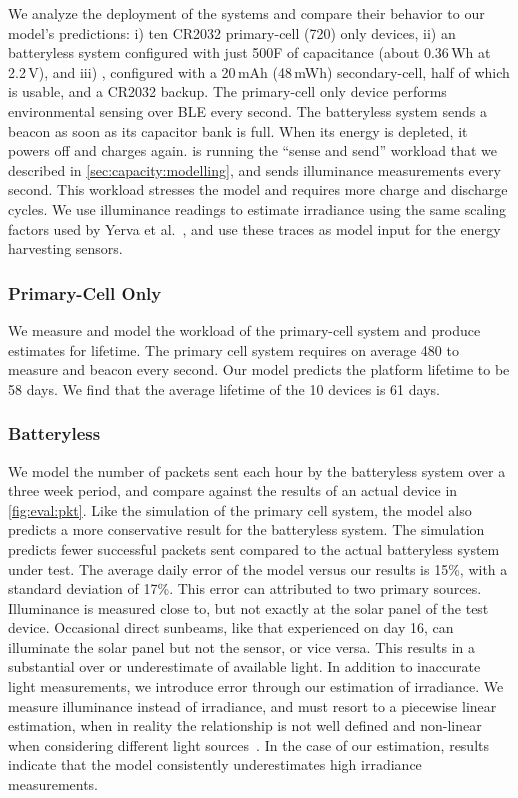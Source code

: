 We analyze the deployment of the systems 
and compare their behavior to our
model's predictions: i) ten CR2032 primary-cell (720\ssi{\milli\Wh}) only devices, ii) an
batteryless system configured with just 500\textmu F of capacitance (about
0.36\,\textmu Wh at 2.2\,V), and iii) \name, configured with a 20\,mAh
(48\,mWh) secondary-cell, half of which is usable, and a CR2032 backup.  The
primary-cell only device performs environmental sensing over BLE every second.
The batteryless system  sends a beacon as soon as its capacitor bank is full.
When its energy is depleted, it powers off and charges
again. \name is running the ``sense and send'' workload that we described in
\cref{sec:capacity:modelling}, and sends illuminance measurements every second. This
workload stresses the model and requires more charge and discharge cycles.  We
use \name illuminance readings to estimate irradiance using the same scaling factors used by
Yerva et al.~\cite{yervaGrafting12}, and use these traces as
model input for the energy harvesting sensors.

\subsubsection{Primary-Cell Only}
We measure and model the workload of the primary-cell system and produce estimates for
lifetime. The primary cell system requires on average 480\ssi{\micro\watt} to measure and beacon every second. Our model predicts the platform lifetime
to be 58 days.  We find that the average lifetime of the 10 devices is 61 days.

\subsubsection{Batteryless}
We model the number of packets sent each hour by the
batteryless system over a three week period, and compare against the results of an actual device in
\cref{fig:eval:pkt}.
Like the simulation of the primary cell system, the model also predicts a more conservative result for the batteryless system. 
The simulation predicts fewer successful packets sent compared to the actual batteryless system under test. 
The average daily error of the model versus our results is 15\%, with a standard deviation of
17\%. This error can attributed to two primary sources. Illuminance is measured
close to, but not exactly at the solar panel of the test device. Occasional
direct sunbeams, like that experienced on day 16, can illuminate the solar
panel but not the sensor, or vice versa. This
results in a substantial over or underestimate of available light. In addition
to inaccurate light measurements, we introduce error through our estimation of
irradiance. We measure illuminance
instead of irradiance, and must resort to a piecewise linear estimation, when
in reality the relationship is not well defined and non-linear when considering
different light sources~\cite{michael2020conversion}. In the case of our estimation, results
indicate that the model consistently underestimates high irradiance measurements.

